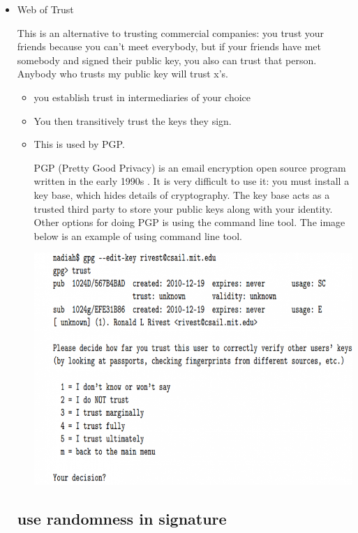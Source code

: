 \documentclass[11pt]{article} %
\begin{document}
\begin{itemize}
  \item  Web of Trust

  This is an alternative to trusting commercial companies: you trust your friends because you can't meet everybody, but if your friends have met somebody and signed their public key, you also can trust that person. Anybody who trusts my public key will trust x’s.
  \begin{itemize}
  \item you establish trust in intermediaries of your choice

  \item You then transitively trust the keys they sign.
  \item This is used by PGP.

  PGP (Pretty Good Privacy) is an email encryption open source program written in the early 1990s . It is very difficult to use it: you must install a key base, which hides details of cryptography. The key base acts as a trusted third party to store your public keys along with your identity. Other options for doing PGP is using the command line tool. The image below is an example of using command line tool.

  \includegraphics[scale=0.45]{./Trust-in-keys2.png}
  
 
  \end{itemize}
  
  
\newpage
\subsection{use randomness in signature}


\end{itemize}
\end{document}
